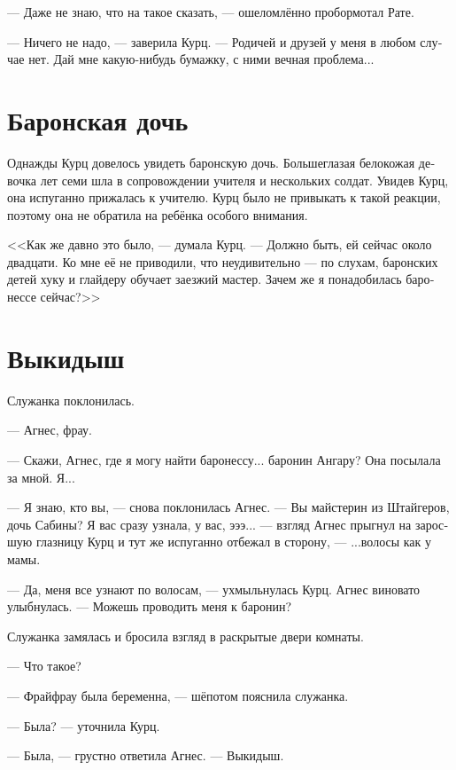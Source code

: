 \documentclass[a4paper,12pt,fleqn]{book}\usepackage{polyglossia}\setdefaultlanguage[babelshorthands=true]{russian}\setotherlanguage{english}\defaultfontfeatures{Ligatures=TeX,Mapping=tex-text}\usepackage{xcolor}\newcommand{\ml}[3]{#2}
\begin{document}
--- Даже не знаю, что на такое сказать, --- ошеломлённо пробормотал Рате.

--- Ничего не надо, --- заверила Курц.
--- Родичей и друзей у меня в любом случае нет.
Дай мне какую-нибудь бумажку, с ними вечная проблема...

\section{Баронская дочь}

Однажды Курц довелось увидеть баронскую дочь.
Большеглазая белокожая девочка лет семи шла в сопровождении учителя и нескольких солдат.
Увидев Курц, она испуганно прижалась к учителю.
Курц было не привыкать к такой реакции, поэтому она не обратила на ребёнка особого внимания.

<<Как же давно это было, --- думала Курц.
--- Должно быть, ей сейчас около двадцати.
Ко мне её не приводили, что неудивительно --- по слухам, баронских детей хуку и глайдеру обучает заезжий мастер.
Зачем же я понадобилась баронессе сейчас?>>

\section{Выкидыш}

Служанка поклонилась.

--- Агнес, фрау.

--- Скажи, Агнес, где я могу найти баронессу... баронин Ангару?
Она посылала за мной.
Я...

--- Я знаю, кто вы, --- снова поклонилась Агнес.
\ml{$0$}
{--- Вы майстерин из Штайгеров, дочь Сабины?}
{``You're the \textit{meisterin}, Steiger kin, Sabina's daughter?}
Я вас сразу узнала, у вас, эээ... --- взгляд Агнес прыгнул на заросшую глазницу Курц и тут же испуганно отбежал в сторону, --- ...волосы как у мамы.

--- Да, меня все узнают по волосам, --- ухмыльнулась Курц.
Агнес виновато улыбнулась.
--- Можешь проводить меня к баронин?

Служанка замялась и бросила взгляд в раскрытые двери комнаты.

--- Что такое?

\ml{$0$}
{--- Фрайфрау была беременна, --- шёпотом пояснила служанка.}
{``Freifrau was pregnant,'' the servant quietly explained.}

\ml{$0$}
{--- Была? --- уточнила Курц.}
{``Was?'' Kurz asked.}

--- Была, --- грустно ответила Агнес.
\ml{$0$}
{--- Выкидыш.}
{``She lost the baby.''}
\end{document}
